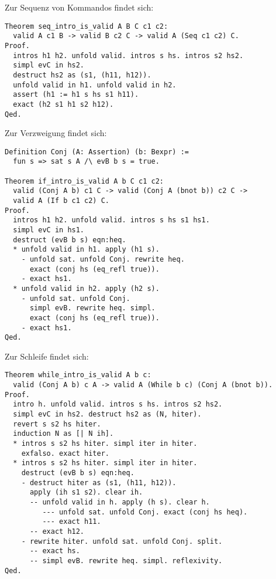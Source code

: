 \documentclass[8pt,fleqn,aspectratio=169]{beamer}
\begin{document}
\begin{frame}[fragile]
Zur Sequenz von Kommandos findet sich:

\begin{small}
\begin{lstlisting}[language=Coq, xleftmargin=\mathindent]
Theorem seq_intro_is_valid A B C c1 c2:
  valid A c1 B -> valid B c2 C -> valid A (Seq c1 c2) C.
Proof.
  intros h1 h2. unfold valid. intros s hs. intros s2 hs2.
  simpl evC in hs2.
  destruct hs2 as (s1, (h11, h12)).
  unfold valid in h1. unfold valid in h2.
  assert (h1 := h1 s hs s1 h11).
  exact (h2 s1 h1 s2 h12).
Qed.
\end{lstlisting}
\end{small}
\end{frame}

\begin{frame}[fragile]
Zur Verzweigung findet sich:

\begin{small}
\begin{lstlisting}[language=Coq, xleftmargin=\mathindent]
Definition Conj (A: Assertion) (b: Bexpr) :=
  fun s => sat s A /\ evB b s = true.

Theorem if_intro_is_valid A b C c1 c2:
  valid (Conj A b) c1 C -> valid (Conj A (bnot b)) c2 C ->
  valid A (If b c1 c2) C.
Proof.
  intros h1 h2. unfold valid. intros s hs s1 hs1.
  simpl evC in hs1.
  destruct (evB b s) eqn:heq.
  * unfold valid in h1. apply (h1 s).
    - unfold sat. unfold Conj. rewrite heq.
      exact (conj hs (eq_refl true)).
    - exact hs1.
  * unfold valid in h2. apply (h2 s).
    - unfold sat. unfold Conj.
      simpl evB. rewrite heq. simpl.
      exact (conj hs (eq_refl true)).
    - exact hs1.
Qed.
\end{lstlisting}
\end{small}
\end{frame}

\begin{frame}[fragile]
Zur Schleife findet sich:

\begin{small}
\begin{lstlisting}[language=Coq, xleftmargin=\mathindent]
Theorem while_intro_is_valid A b c:
  valid (Conj A b) c A -> valid A (While b c) (Conj A (bnot b)).
Proof.
  intro h. unfold valid. intros s hs. intros s2 hs2.
  simpl evC in hs2. destruct hs2 as (N, hiter).
  revert s s2 hs hiter.
  induction N as [| N ih].
  * intros s s2 hs hiter. simpl iter in hiter.
    exfalso. exact hiter.
  * intros s s2 hs hiter. simpl iter in hiter.
    destruct (evB b s) eqn:heq.
    - destruct hiter as (s1, (h11, h12)).
      apply (ih s1 s2). clear ih.
      -- unfold valid in h. apply (h s). clear h.
         --- unfold sat. unfold Conj. exact (conj hs heq).
         --- exact h11.
      -- exact h12.
    - rewrite hiter. unfold sat. unfold Conj. split.
      -- exact hs.
      -- simpl evB. rewrite heq. simpl. reflexivity.
Qed.
\end{lstlisting}
\end{small}
\end{frame}
\end{document}
